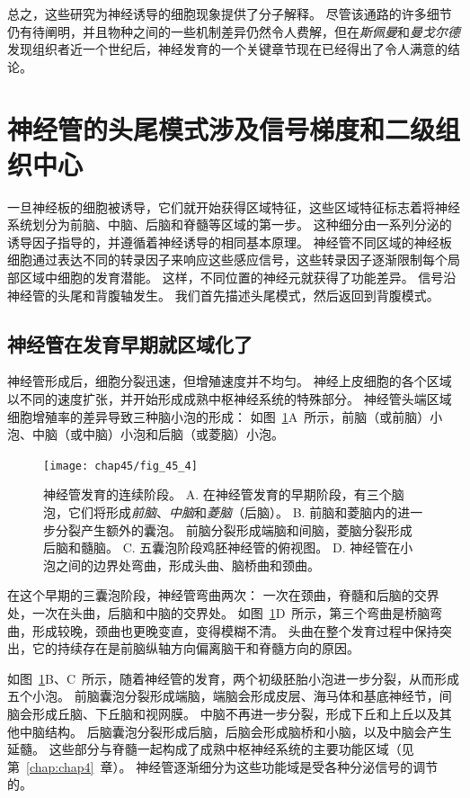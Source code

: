 总之，这些研究为神经诱导的细胞现象提供了分子解释。
尽管该通路的许多细节仍有待阐明，并且物种之间的一些机制差异仍然令人费解，但在\textit{斯佩曼}和\textit{曼戈尔德}发现组织者近一个世纪后，神经发育的一个关键章节现在已经得出了令人满意的结论。



\section{神经管的头尾模式涉及信号梯度和二级组织中心}

一旦神经板的细胞被诱导，它们就开始获得区域特征，这些区域特征标志着将神经系统划分为前脑、中脑、后脑和脊髓等区域的第一步。
这种细分由一系列分泌的诱导因子指导的，并遵循着神经诱导的相同基本原理。
神经管不同区域的神经板细胞通过表达不同的转录因子来响应这些感应信号，这些转录因子逐渐限制每个局部区域中细胞的发育潜能。
这样，不同位置的神经元就获得了功能差异。
信号沿神经管的头尾和背腹轴发生。
我们首先描述头尾模式，然后返回到背腹模式。



\subsection{神经管在发育早期就区域化了}

神经管形成后，细胞分裂迅速，但增殖速度并不均匀。
神经上皮细胞的各个区域以不同的速度扩张，并开始形成成熟中枢神经系统的特殊部分。
神经管头端区域细胞增殖率的差异导致三种脑小泡的形成：
如图~\ref{fig:45_4}A~所示，前脑（或前脑）小泡、中脑（或中脑）小泡和后脑（或菱脑）小泡。


\begin{figure}[htbp]
	\centering
	\texttt{[image: chap45/fig\_45\_4]}
	\caption{神经管发育的连续阶段。
		A. 在神经管发育的早期阶段，有三个脑泡，它们将形成\textit{前脑}、\textit{中脑}和\textit{菱脑}（后脑）。
		B. 前脑和菱脑内的进一步分裂产生额外的囊泡。
		前脑分裂形成端脑和间脑，菱脑分裂形成后脑和髓脑。
		C. 五囊泡阶段鸡胚神经管的俯视图。
		D. 神经管在小泡之间的边界处弯曲，形成头曲、脑桥曲和颈曲。}
	\label{fig:45_4}
\end{figure}


在这个早期的三囊泡阶段，神经管弯曲两次：
一次在颈曲，脊髓和后脑的交界处，一次在头曲，后脑和中脑的交界处。
如图~\ref{fig:45_4}D~所示，第三个弯曲是桥脑弯曲，形成较晚，颈曲也更晚变直，变得模糊不清。
头曲在整个发育过程中保持突出，它的持续存在是前脑纵轴方向偏离脑干和脊髓方向的原因。


如图~\ref{fig:45_4}B、C~所示，随着神经管的发育，两个初级胚胎小泡进一步分裂，从而形成五个小泡。
前脑囊泡分裂形成端脑，端脑会形成皮层、海马体和基底神经节，间脑会形成丘脑、下丘脑和视网膜。
中脑不再进一步分裂，形成下丘和上丘以及其他中脑结构。
后脑囊泡分裂形成后脑，后脑会形成脑桥和小脑，以及中脑会产生延髓。
这些部分与脊髓一起构成了成熟中枢神经系统的主要功能区域（见第~\ref{chap:chap4}~章）。
神经管逐渐细分为这些功能域是受各种分泌信号的调节的。



